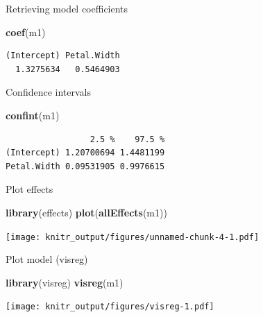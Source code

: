\documentclass[10pt,ignorenonframetext,]{beamer}
\newenvironment{Shaded}{\begin{snugshade}}{\end{snugshade}}
\newcommand{\KeywordTok}[1]{\textcolor[rgb]{0.13,0.29,0.53}{\textbf{{#1}}}}
\newcommand{\NormalTok}[1]{{#1}}
\begin{document}
\begin{frame}[fragile]{Retrieving model coefficients}

\begin{Shaded}
\begin{Highlighting}[]
\KeywordTok{coef}\NormalTok{(m1)}
\end{Highlighting}
\end{Shaded}

\begin{verbatim}
(Intercept) Petal.Width 
  1.3275634   0.5464903 
\end{verbatim}

\end{frame}

\begin{frame}[fragile]{Confidence intervals}

\begin{Shaded}
\begin{Highlighting}[]
\KeywordTok{confint}\NormalTok{(m1)}
\end{Highlighting}
\end{Shaded}

\begin{verbatim}
                 2.5 %    97.5 %
(Intercept) 1.20700694 1.4481199
Petal.Width 0.09531905 0.9976615
\end{verbatim}

\end{frame}

\begin{frame}[fragile]{Plot effects}

\begin{Shaded}
\begin{Highlighting}[]
\KeywordTok{library}\NormalTok{(effects)}
\KeywordTok{plot}\NormalTok{(}\KeywordTok{allEffects}\NormalTok{(m1))}
\end{Highlighting}
\end{Shaded}

\texttt{[image: knitr\_output/figures/unnamed-chunk-4-1.pdf]}

\end{frame}

\begin{frame}[fragile]{Plot model (visreg)}

\begin{Shaded}
\begin{Highlighting}[]
\KeywordTok{library}\NormalTok{(visreg)}
\KeywordTok{visreg}\NormalTok{(m1)}
\end{Highlighting}
\end{Shaded}

\texttt{[image: knitr\_output/figures/visreg-1.pdf]}

\end{frame}
\end{document}

